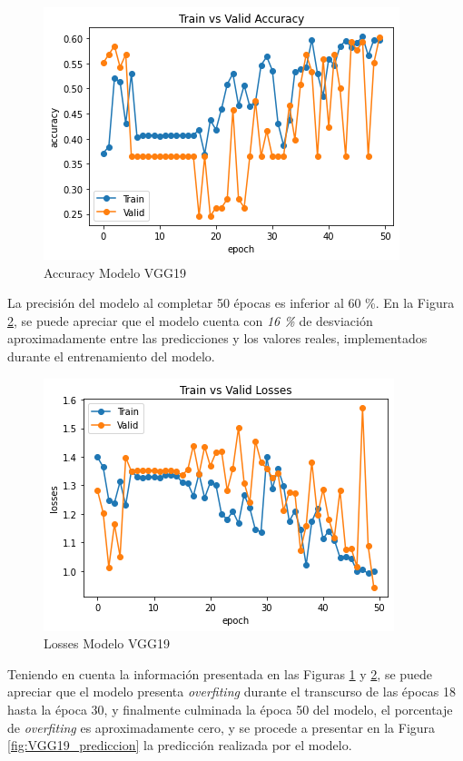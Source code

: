 								
				\begin{figure}[ht]
					\centering
					\includegraphics[scale=0.5]{Figs/101.png}
					\caption{Accuracy Modelo VGG19}
					\label{fig:VGG19_accuracy}
				\end{figure}  

				La precisión del modelo al completar 50 épocas es inferior al 60 \%.	En la Figura \ref{fig:VGG19_losses}, se puede apreciar que el modelo cuenta con \textit{16 \%} de desviación aproximadamente entre las predicciones y los valores reales, implementados durante el entrenamiento del modelo.
				
				\begin{figure}[ht]
					\centering
					\includegraphics[scale=0.55]{Figs/102.png}
					\caption{Losses Modelo VGG19}
					\label{fig:VGG19_losses}
				\end{figure}
			
			Teniendo en cuenta la información presentada en las Figuras \ref{fig:VGG19_accuracy} y \ref{fig:VGG19_losses}, se puede apreciar que el modelo presenta \textit{overfiting} durante el transcurso de las épocas 18 hasta la época 30, y finalmente culminada la época 50 del modelo, el porcentaje de \textit{overfiting} es aproximadamente cero, y se procede a presentar en la Figura \ref*{fig:VGG19_prediccion} la predicción realizada por el modelo.
			
